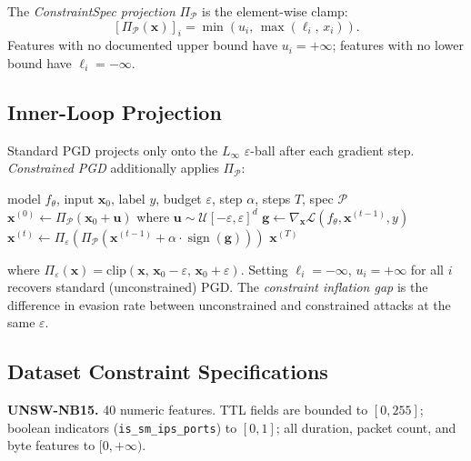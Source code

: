\documentclass[sigconf,anonymous=true]{acmart}
\begin{document}
The \emph{ConstraintSpec projection} $\Pi_\mathcal{P}$ is the
element-wise clamp:
\[
  \left[\Pi_\mathcal{P}(\mathbf{x})\right]_i =
  \min\!\left(u_i,\, \max\!\left(\ell_i,\, x_i\right)\right).
\]
Features with no documented upper bound have $u_i = +\infty$; features
with no lower bound have $\ell_i = -\infty$.

\subsection{Inner-Loop Projection}

Standard PGD projects only onto the $L_\infty$ $\varepsilon$-ball after
each gradient step.  \emph{Constrained PGD} additionally applies
$\Pi_\mathcal{P}$:

\begin{algorithm}[h]
\caption{Constrained PGD}
\begin{algorithmic}[1]
\REQUIRE model $f_\theta$, input $\mathbf{x}_0$, label $y$,
         budget $\varepsilon$, step $\alpha$, steps $T$,
         spec $\mathcal{P}$
\STATE $\mathbf{x}^{(0)} \leftarrow \Pi_\mathcal{P}\!\left(
         \mathbf{x}_0 + \mathbf{u}\right)$
         where $\mathbf{u} \sim \mathcal{U}[-\varepsilon, \varepsilon]^d$
  \STATE $\mathbf{g} \leftarrow \nabla_{\mathbf{x}} \mathcal{L}(f_\theta,
         \mathbf{x}^{(t-1)}, y)$
  \STATE $\mathbf{x}^{(t)} \leftarrow \Pi_\varepsilon\!\left(
         \Pi_\mathcal{P}\!\left(
           \mathbf{x}^{(t-1)} + \alpha \cdot \operatorname{sign}(\mathbf{g})
         \right)\right)$
\ENDFOR
\RETURN $\mathbf{x}^{(T)}$
\end{algorithmic}
\end{algorithm}

\noindent
where $\Pi_\varepsilon(\mathbf{x}) =
\text{clip}(\mathbf{x},\, \mathbf{x}_0 - \varepsilon,\,
\mathbf{x}_0 + \varepsilon)$.
Setting $\ell_i = -\infty$, $u_i = +\infty$ for all $i$ recovers
standard (unconstrained) PGD.  The \emph{constraint inflation gap} is
the difference in evasion rate between unconstrained and constrained
attacks at the same $\varepsilon$.

\subsection{Dataset Constraint Specifications}

\textbf{UNSW-NB15.}  40 numeric features.  TTL fields are bounded to
$[0, 255]$; boolean indicators (\texttt{is\_sm\_ips\_ports}) to
$[0,1]$; all duration, packet count, and byte features to $[0, +\infty)$.
\end{document}

